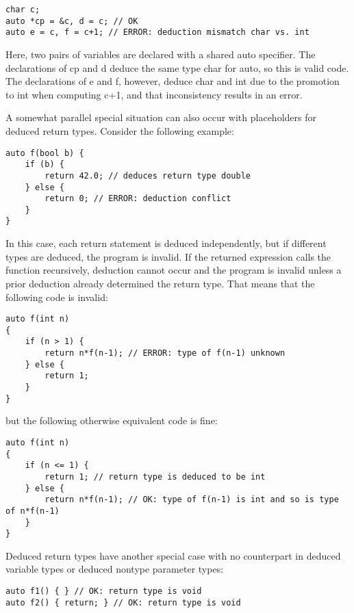 \begin{lstlisting}[style=styleCXX]
char c;
auto *cp = &c, d = c; // OK
auto e = c, f = c+1; // ERROR: deduction mismatch char vs. int
\end{lstlisting}

Here, two pairs of variables are declared with a shared auto specifier. The declarations of cp and d deduce the same type char for auto, so this is valid code. The declarations of e and f, however, deduce char and int due to the promotion to int when computing c+1, and that inconsistency results in an error.

A somewhat parallel special situation can also occur with placeholders for deduced return types. Consider the following example:

\begin{lstlisting}[style=styleCXX]
auto f(bool b) {
	if (b) {
		return 42.0; // deduces return type double
	} else {
		return 0; // ERROR: deduction conflict
	}
}
\end{lstlisting}

In this case, each return statement is deduced independently, but if different types are deduced, the program is invalid. If the returned expression calls the function recursively, deduction cannot occur and the program is invalid unless a prior deduction already determined the return type. That means that the following code is invalid:

\begin{lstlisting}[style=styleCXX]
auto f(int n)
{
	if (n > 1) {
		return n*f(n-1); // ERROR: type of f(n-1) unknown
	} else {
		return 1;
	}
}
\end{lstlisting}

but the following otherwise equivalent code is fine:

\begin{lstlisting}[style=styleCXX]
auto f(int n)
{
	if (n <= 1) {
		return 1; // return type is deduced to be int
	} else {
		return n*f(n-1); // OK: type of f(n-1) is int and so is type of n*f(n-1)
	}
}
\end{lstlisting}

Deduced return types have another special case with no counterpart in deduced variable types or deduced nontype parameter types:

\begin{lstlisting}[style=styleCXX]
auto f1() { } // OK: return type is void
auto f2() { return; } // OK: return type is void
\end{lstlisting}

